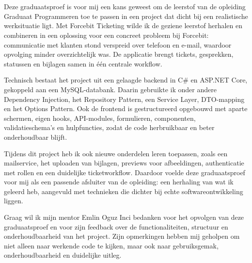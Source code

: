 ﻿%

\chapter*{}%
\label{ch:voorwoord}


Deze graduaatsproef is voor mij een kans geweest om de leerstof van de opleiding Graduaat Programmeren toe te passen in een project dat dicht bij een realistische werksituatie ligt.
Met Forcebit Ticketing wilde ik de geziene leerstof herhalen en combineren in een oplossing voor een concreet probleem bij Forcebit: communicatie met klanten stond verspreid over telefoon en e-mail, waardoor opvolging minder overzichtelijk was.
De applicatie brengt tickets, gesprekken, statussen en bijlagen samen in één centrale workflow.

\medskip

Technisch bestaat het project uit een gelaagde backend in C\# en ASP.NET Core, gekoppeld aan een MySQL-databank.
Daarin gebruikte ik onder andere Dependency Injection, het Repository Pattern, een Service Layer, DTO-mapping en het Options Pattern.
Ook de frontend is gestructureerd opgebouwd met aparte schermen, eigen hooks, API-modules, formulieren, componenten, validatieschema's en hulpfuncties, zodat de code herbruikbaar en beter onderhoudbaar blijft.

\medskip

Tijdens dit project heb ik ook nieuwe onderdelen leren toepassen, zoals een mailservice, het uploaden van bijlagen, previews voor afbeeldingen, authenticatie met rollen en een duidelijke ticketworkflow.
Daardoor voelde deze graduaatsproef voor mij als een passende afsluiter van de opleiding: een herhaling van wat ik geleerd heb, aangevuld met technieken die dichter bij echte softwareontwikkeling liggen.

\medskip

Graag wil ik mijn mentor Emlin Oguz Inci bedanken voor het opvolgen van deze graduaatsproef en voor zijn feedback over de functionaliteiten, structuur en onderhoudbaarheid van het project.
Zijn opmerkingen hebben mij geholpen om niet alleen naar werkende code te kijken, maar ook naar gebruiksgemak, onderhoudbaarheid en duidelijke uitleg.

